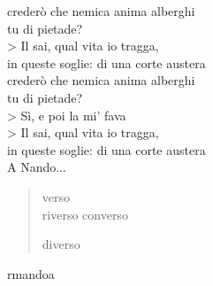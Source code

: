 \documentclass[a5paper,11pt]{book}
\begin{document}
\actname


\begin{versedrama}
crederò che nemica anima alberghi\\
tu di pietade?\\> %
\isabellaspeaks
Il sai, qual vita io tragga,\\ %
in queste soglie: di una corte austera\\
crederò che nemica anima alberghi\\
tu di pietade?\\> %
Sì, e poi la mi' fava\\> %
\isabellaspeaks
Il sai, qual vita io tragga,\\ %
in queste soglie: di una corte austera\\
A Nando...
\end{versedrama}

\begin{verse}
verso\\
riverso\newline
converso\newline
\item diverso
\end{verse}

\actname
{}
\actname
{}
\actname
{}
\actname
{}
\actname
{}
\actname
{}
\actname
{}
\actname
{}
\actname
{}
\actname
{}
\actname

\def\test{\prova rmando}
\def\riprova{\futurelet\prova\test}
\riprova a
\end{document}
